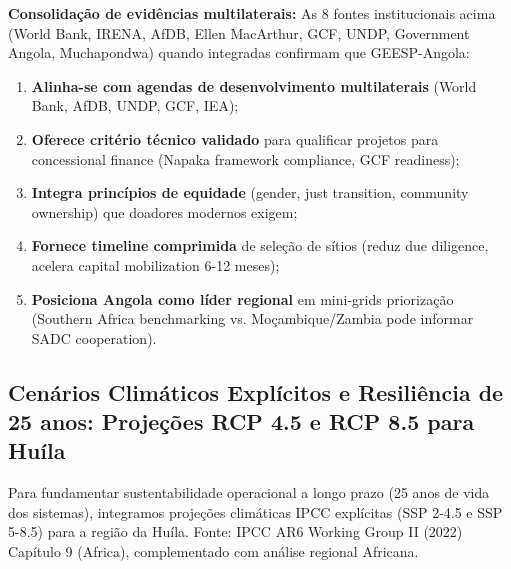 \documentclass[12pt, a4paper]{article}
\begin{document}
\textbf{Consolidação de evidências multilaterais:} As 8 fontes institucionais acima (World Bank, IRENA, AfDB, Ellen MacArthur, GCF, UNDP, Government Angola, Muchapondwa) quando integradas confirmam que GEESP-Angola:
\begin{enumerate}
\item \textbf{Alinha-se com agendas de desenvolvimento multilaterais} (World Bank, AfDB, UNDP, GCF, IEA);
\item \textbf{Oferece critério técnico validado} para qualificar projetos para concessional finance (Napaka framework compliance, GCF readiness);
\item \textbf{Integra princípios de equidade} (gender, just transition, community ownership) que doadores modernos exigem;
\item \textbf{Fornece timeline comprimida} de seleção de sítios (reduz due diligence, acelera capital mobilization 6-12 meses);
\item \textbf{Posiciona Angola como líder regional} em mini-grids priorização (Southern Africa benchmarking vs. Moçambique/Zambia pode informar SADC cooperation).
\end{enumerate}



\subsection{Cenários Climáticos Explícitos e Resiliência de 25 anos: Projeções RCP 4.5 e RCP 8.5 para Huíla}

Para fundamentar sustentabilidade operacional a longo prazo (25 anos de vida dos sistemas), integramos projeções climáticas IPCC explícitas (SSP 2-4.5 e SSP 5-8.5) para a região da Huíla. Fonte: IPCC AR6 Working Group II (2022) Capítulo 9 (Africa), complementado com análise regional Africana.
\end{document}
